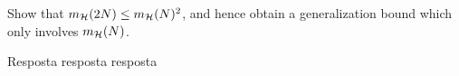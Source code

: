 \begin{enunciado}{10}
    Show that $m_{\mathcal{H}}(2N) \le m_{\mathcal{H}}(N)^2$, and hence obtain a generalization bound which only involves $m_{\mathcal{H}}(N)$.
\end{enunciado}

Resposta resposta resposta